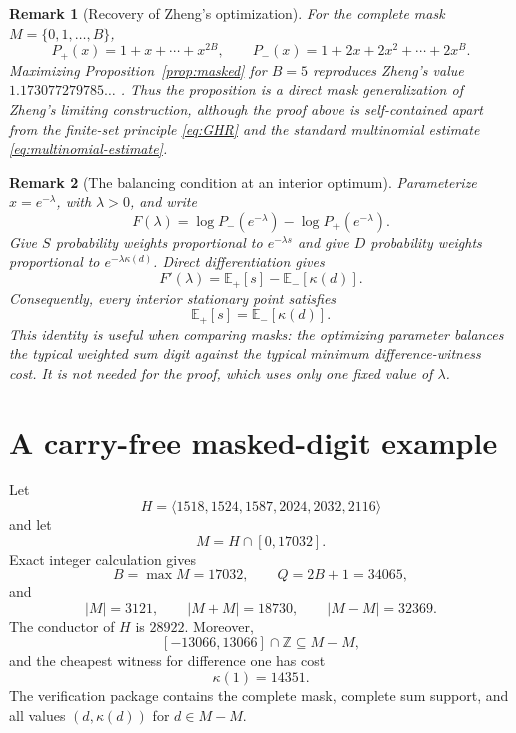 \documentclass[11pt]{article}
\newtheorem{remark}{Remark}
\newcommand{\card}[1]{\lvert #1\rvert}
\newcommand{\angles}[1]{\langle #1\rangle}
\begin{document}
\begin{remark}[Recovery of Zheng's optimization]
For the complete mask $M=\{0,1,\ldots,B\}$,
\[
 P_+(x)=1+x+\cdots+x^{2B},
 \qquad
 P_-(x)=1+2x+2x^2+\cdots+2x^B.
\]
Maximizing Proposition~\ref{prop:masked} for $B=5$ reproduces Zheng's value
$1.173077279785\ldots$ \cite{Zheng2025}. Thus the proposition is a direct mask
generalization of Zheng's limiting construction, although the proof above is
self-contained apart from the finite-set principle \eqref{eq:GHR}
and the standard multinomial estimate \eqref{eq:multinomial-estimate}.
\end{remark}

\begin{remark}[The balancing condition at an interior optimum]\label{rem:moment}
Parameterize $x=e^{-\lambda}$, with $\lambda>0$, and write
\[
 F(\lambda)=\log P_-(e^{-\lambda})-\log P_+(e^{-\lambda}).
\]
Give $S$ probability weights proportional to $e^{-\lambda s}$ and give
$D$ probability weights proportional to $e^{-\lambda\kappa(d)}$.  Direct
differentiation gives
\[
 F'(\lambda)
 =\mathbb E_+[s]-\mathbb E_-[\kappa(d)].
\]
Consequently, every interior stationary point satisfies
\[
 \mathbb E_+[s]=\mathbb E_-[\kappa(d)].
\]
This identity is useful when comparing masks: the optimizing parameter
balances the typical weighted sum digit against the typical minimum
difference-witness cost.  It is not needed for the proof, which uses only
one fixed value of $\lambda$.
\end{remark}

\section{A carry-free masked-digit example}
Let
\begin{equation}\label{eq:record-mask}
 H=\angles{1518,1524,1587,2024,2032,2116}
\end{equation}
and let
\[
 M=H\cap[0,17032].
\]
Exact integer calculation gives
\[
 B=\max M=17032,
 \qquad Q=2B+1=34065,
\]
and
\begin{equation}\label{eq:counts}
 \card M=3121,\qquad
 \card{M+M}=18730,\qquad
 \card{M-M}=32369.
\end{equation}
The conductor of $H$ is $28922$.  Moreover,
\[
 [-13066,13066]\cap\mathbb Z\subseteq M-M,
\]
and the cheapest witness for difference one
has cost
\[
 \kappa(1)=14351.
\]
The verification package contains the complete mask, complete sum support,
and all values $(d,\kappa(d))$ for $d\in M-M$.
\end{document}
